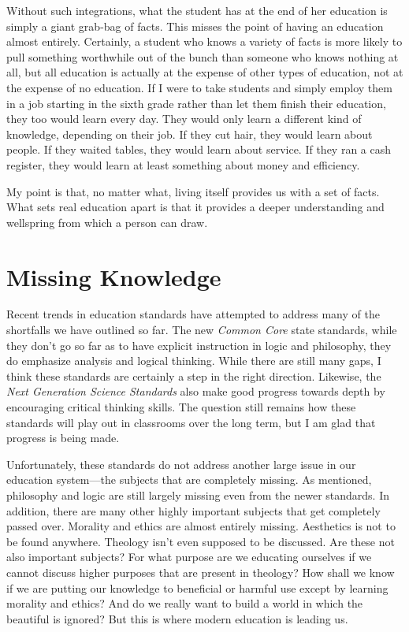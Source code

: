 Without such integrations, what the student has at the end of
her education is
simply a giant grab-bag of facts. This misses the point of having an
education almost entirely. Certainly, a student who knows a variety of
facts is more likely to pull something worthwhile out of
the bunch than
someone who knows nothing at all, but all education is actually at the
expense of other types of education, not at the expense of no
education. If I were to take students and simply employ them in a job
starting in the sixth grade rather than let them finish their
education, they too
would learn every
day. They would only learn a different kind of knowledge, depending on
their job. If they cut hair, they would learn about people. If they
waited tables, they would learn about service. If they ran a cash
register, they would learn at least something about money and
efficiency. 

My point is that, no matter what, living itself provides us with a set
of facts. What sets real education apart is that it provides a deeper
understanding and wellspring from which a person can draw. 

\section{Missing Knowledge}

Recent trends in education standards have attempted to address many
of the shortfalls we have outlined so far.
The new \textit{Common Core} state standards, while they don't go
so far as to have explicit instruction in logic and philosophy, they
do emphasize analysis and logical thinking.  
While there are still many gaps, I think these standards
are certainly a step in the right direction.  Likewise, the 
\textit{Next Generation Science Standards} also make good progress towards
depth by encouraging critical thinking skills.  The question still remains 
how these standards will play out in classrooms
over the long term, but I am glad that progress is being made.

Unfortunately, these standards do not address another large issue in our education
system---the subjects that are completely missing.  As mentioned, 
philosophy and logic are still largely missing even from the
newer standards. In addition, there are many other highly
important subjects that get completely passed over. Morality and ethics
are almost entirely missing. Aesthetics is not to be found anywhere.
Theology isn’t even supposed to be discussed. Are these not also
important subjects?  For what purpose are we educating ourselves if we
cannot discuss higher purposes that are present in theology?  How shall
we know if we are putting our knowledge to beneficial or harmful use
except by learning morality and ethics?  And do we really want to build
a world in which the beautiful is ignored?  But this is where modern
education is leading us.

